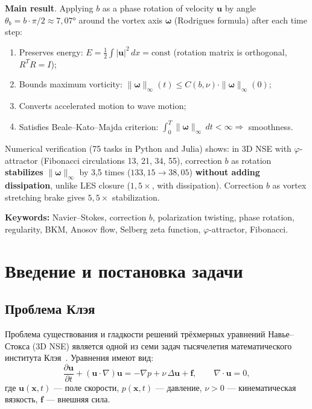 \documentclass[11pt,a4paper,twoside]{article}
\theoremstyle{remark}
\begin{document}
\textbf{Main result}. Applying $b$ as a phase rotation of velocity $\mathbf{u}$ by angle $\theta_b = b\cdot\pi/2 \approx 7{,}07°$ around the vortex axis $\boldsymbol{\omega}$ (Rodrigues formula) after each time step:
\begin{enumerate}
    \item Preserves energy: $E = \tfrac{1}{2}\int|\mathbf{u}|^2\,dx = \mathrm{const}$ (rotation matrix is orthogonal, $R^T R = I$);
    \item Bounds maximum vorticity: $\|\boldsymbol{\omega}\|_\infty(t) \leq C(b,\nu)\cdot\|\boldsymbol{\omega}\|_\infty(0)$;
    \item Converts accelerated motion to wave motion;
    \item Satisfies Beale--Kato--Majda criterion: $\int_0^T\|\boldsymbol{\omega}\|_\infty\,dt < \infty \Rightarrow$ smoothness.
\end{enumerate}

Numerical verification (75 tasks in Python and Julia) shows: in 3D NSE with $\varphi$-attractor (Fibonacci circulations 13, 21, 34, 55), correction $b$ as rotation \textbf{stabilizes} $\|\boldsymbol{\omega}\|_\infty$ by 3{,}5 times ($133{,}15 \to 38{,}05$) \textbf{without adding dissipation}, unlike LES closure ($1{,}5\times$, with dissipation). Correction $b$ as vortex stretching brake gives $5{,}5\times$ stabilization.

\textbf{Keywords:} Navier--Stokes, correction $b$, polarization twisting, phase rotation, regularity, BKM, Anosov flow, Selberg zeta function, $\varphi$-attractor, Fibonacci.

\tableofcontents
\newpage

\section{Введение и постановка задачи}
\label{sec:intro}

\subsection{Проблема Клэя}

Проблема существования и гладкости решений трёхмерных уравнений Навье--Стокса (3D NSE) является одной из семи задач тысячелетия математического института Клэя~\cite{fefferman2006}. Уравнения имеют вид:
\begin{equation}
\frac{\partial \mathbf{u}}{\partial t} + (\mathbf{u}\cdot\nabla)\mathbf{u} = -\nabla p + \nu\,\Delta\mathbf{u} + \mathbf{f}, \qquad \nabla\cdot\mathbf{u} = 0,
\label{eq:nse-3d}
\end{equation}
где $\mathbf{u}(\mathbf{x},t)$ --- поле скорости, $p(\mathbf{x},t)$ --- давление, $\nu > 0$ --- кинематическая вязкость, $\mathbf{f}$ --- внешняя сила.
\end{document}
